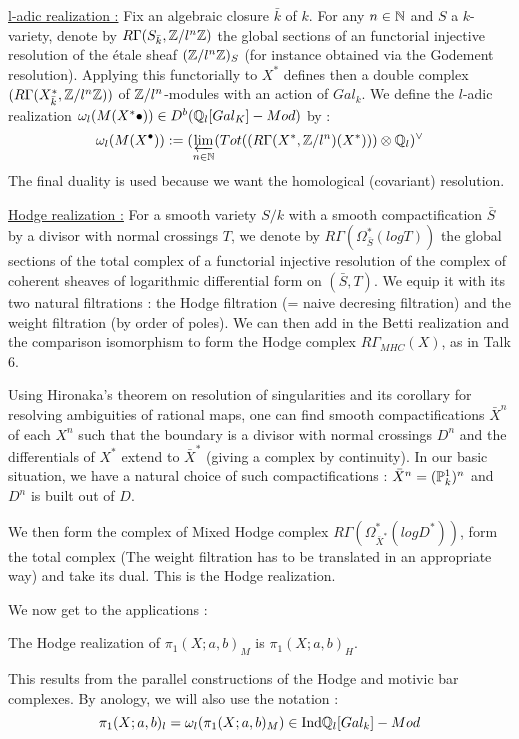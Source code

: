 \underline{l-adic realization :} Fix an algebraic closure $\bar{k}$ of $k$. For any $n\in\mathbb{N}$ and $S$ a $k$-variety, denote by $R\Gamma(S_{\bar{k}},\mathbb{Z}/l^n\mathbb{Z})$ the global sections of an functorial injective resolution of the \'etale sheaf $(\mathbb{Z}/l^n\mathbb{Z})_S$ (for instance obtained via the Godement resolution). Applying this functorially to $X^*$ defines then a double complex $(R\Gamma(X^*_{\bar{k}},\mathbb{Z}/l^n\mathbb{Z}))$ of $\mathbb{Z}/l^n$-modules with an action of $Gal_k$. We define the $l$-adic realization $\omega_l(M(X^*\bullet))\in D^b(\mathbb{Q}_l[Gal_K]-Mod)$ by :
\[
\omega_l(M(X^{\bullet})):=(\varprojlim_{n\in \mathbb{N}}(Tot((R\Gamma(X^*,\mathbb{Z}/l^n)(X^*)))\otimes \mathbb{Q}_l)^\vee
\]
The final duality is used because we want the homological (covariant) resolution.

\underline{Hodge realization :} For a smooth variety $S/k$ with a smooth compactification $\bar{S}$ by a divisor with normal crossings $T$, we denote by $R\Gamma(\Omega^*_{\bar{S}}(log T))$ the global sections of the total complex of a functorial injective resolution of the complex of coherent sheaves of logarithmic differential form on $(\bar{S},T)$. We equip it with its two natural filtrations : the Hodge filtration (= naive decresing filtration) and the weight filtration (by order of poles). We can then add in the Betti realization and the comparison isomorphism to form the Hodge complex $R\Gamma_{MHC}(X)$, as in Talk 6.

 Using Hironaka's theorem on resolution of singularities and its corollary for resolving ambiguities of rational maps, one can find smooth compactifications $\bar{X}^n$ of each $X^n$ such that the boundary is a divisor with normal crossings $D^n$ and the differentials of $X^*$ extend to $\bar{X}^*$ (giving a complex by continuity). In our basic situation, we have a natural choice of such compactifications : $\bar{X}^n=(\mathbb{P}^1_k)^n$ and $D^n$ is built out of $D$.

We then form the complex of Mixed Hodge complex $R\Gamma(\Omega^*_{\bar{X}^*}(log D^*))$, form the total complex (The weight filtration has to be translated in an appropriate way) and take its dual. This is the Hodge realization.

We now get to the applications :

\begin{prop}
The Hodge realization of $\pi_1(X;a,b)_M$ is $\pi_1(X;a,b)_H$.
\end{prop}

This results from the parallel constructions of the Hodge and motivic bar complexes. By anology, we will also use the notation :
\[
\pi_1(X;a,b)_l=\omega_l(\pi_1(X;a,b)_M)\in \mathrm{Ind}\mathbb{Q}_l[Gal_k]-Mod
\]

